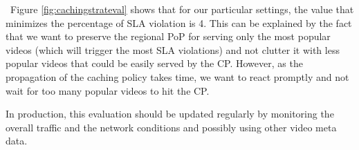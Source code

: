 ~Figure \ref{fig:cachingstrateval} shows that for our particular settings, the value that minimizes the percentage of SLA violation is 4. This can be explained by the fact that we want to preserve the regional PoP for serving only the most popular videos (which will trigger the most SLA violations) and not clutter it with less popular videos that could be easily served by the CP. However, as the propagation of the caching policy takes time, we want to react promptly and not wait for too many popular videos to hit the CP.

In production, this evaluation should be updated regularly by monitoring the overall traffic and the network conditions and possibly using other video meta data.





